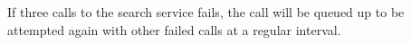 \documentclass[12pt,a4paper]{article}
\begin{document}
If three calls to the search service fails, the call will be queued up to be
attempted again with other failed calls at a regular interval.

\end{document}
